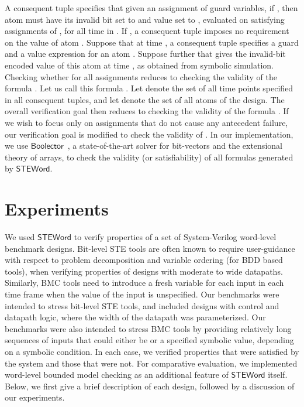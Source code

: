 \documentclass{llncs}
\newcommand{\steword}{\ensuremath{\mathsf{STEWord}}}
\newcommand{\Boolector}{\ensuremath{\mathsf{Boolector}}}
\begin{document}
A consequent tuple  specifies that given an
assignment  of guard variables, if , then atom
 must have its invalid bit set to  and value set to
, evaluated on satisfying assignments of , for all time
in .  If , a
consequent tuple imposes no requirement on the value of atom .
Suppose that at time , a consequent tuple specifies a guard  and
a value expression  for an atom .  Suppose further that
 gives the invalid-bit encoded value of this
atom at time , as obtained from symbolic simulation.  Checking
whether 
for all assignments  reduces to checking the validity of the
formula .  Let us call this formula .  Let  denote
the set of all time points specified in all consequent tuples, and let
 denote the set of all atoms of the design.  The overall
verification goal then reduces to checking the validity of the formula
.  If we
wish to focus only on assignments  that do not cause any
antecedent failure, our verification goal is modified to check the
validity of .  In our implementation, we
use {\Boolector}~\cite{BrummayerBiere09}, a state-of-the-art solver
for bit-vectors and the extensional theory of arrays, to check the
validity (or satisfiability) of all formulas  generated by
{\steword}.

\section{Experiments}\label{sec:experiments}
We used {\steword} to verify properties of a set of System-Verilog
word-level benchmark designs.  Bit-level STE tools are often known to
require user-guidance with respect to problem decomposition and
variable ordering (for BDD based tools), when verifying properties of
designs with moderate to wide datapaths.  Similarly, BMC tools need to
introduce a fresh variable for each input in each time frame when the
value of the input is unspecified.  Our benchmarks were intended to
stress bit-level STE tools, and included designs with control and
datapath logic, where the width of the datapath was parameterized.
Our benchmarks were also intended to stress BMC tools by providing
relatively long sequences of inputs that could either be  or a
specified symbolic value, depending on a symbolic condition.  In each
case, we verified properties that were satisfied by the system and
those that were not.  For comparative evaluation, we implemented
word-level bounded model checking as an additional feature of
{\steword} itself.  Below, we first give a brief description of each
design, followed by a discussion of our experiments.
\end{document}
